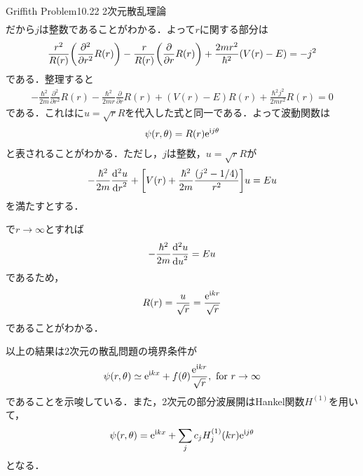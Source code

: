 \documentclass{report}
\begin{document}
\begin{myexc}{Griffith Problem10.22 2次元散乱理論}{}
\begin{align}
    \end{align}
    だから$j$は整数であることがわかる．よって$r$に関する部分は
    \begin{align}
      \frac{r^2}{R(r)}\qty(\frac{\partial^2}{\partial r^2}R(r)) - \frac{r}{R(r)}\qty(\frac{\partial}{\partial r}R(r)) + \frac{2mr^2}{\hbar^2}(V(r) - E) = -j^2
    \end{align}
    である．整理すると
    \begin{align}
      -\frac{\hbar^2}{2m}\frac{\partial^2}{\partial r^2}R(r) - \frac{\hbar^2}{2mr}\frac{\partial}{\partial r}R(r) + (V(r) - E)R(r) + \frac{\hbar^2 j^2}{2mr^2}R(r) = 0
    \end{align}
    である．これはに$u=\sqrt{r}R$を代入した式と同一である．よって波動関数は
    \begin{align}
      \psi(r,\theta) = R(r)\mathrm{e}^{\mathrm{i} j\theta}
    \end{align}
    と表されることがわかる．ただし，$j$は整数，$u=\sqrt{r}R$が
    \begin{align}
      -\frac{\hbar^2}{2m}\frac{\mathrm{d}^2 u}{\dd{r}^2} + \qty[V(r) + \frac{\hbar^2}{2m}\frac{(j^2 - 1/4)}{r^2}]u = Eu
    \end{align}
    を満たすとする．
    
    で$r\to\infty$とすれば
    \begin{align}
      -\frac{\hbar^2}{2m}\frac{\mathrm{d}^2 u}{\dd{u}^2} = Eu
    \end{align}
    であるため，
    \begin{align}
      R(r) = \frac{u}{\sqrt{r}} = \frac{\mathrm{e}^{\mathrm{i} kr}}{\sqrt{r}}
    \end{align}
    であることがわかる．

    以上の結果は2次元の散乱問題の境界条件が
    \begin{align}
      \psi(r,\theta) \simeq \mathrm{e}^{\mathrm{i} kx} + f(\theta)\frac{\mathrm{e}^{\mathrm{i} kr}}{\sqrt{r}},\ \mathrm{for}\ r \to \infty
    \end{align}
    であることを示唆している．また，2次元の部分波展開はHankel関数$H^{(1)}$を用いて，
    \begin{align}
      \psi(r,\theta) = \mathrm{e}^{\mathrm{i} kx} + \sum_{j} c_j H^{(1)}_j (kr) \mathrm{e}^{\mathrm{i} j\theta}
    \end{align}
    となる．
  \end{myexc}
\end{document}
